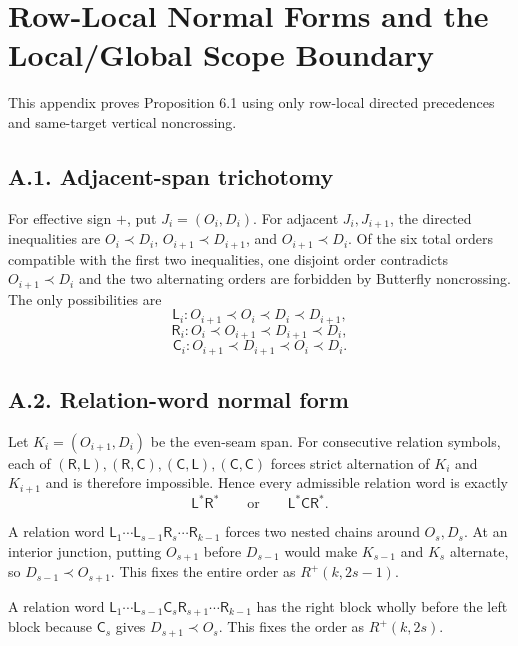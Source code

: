\documentclass[11pt]{article}
\theoremstyle{definition}
\theoremstyle{remark}
\begin{document}
\appendix
\section{Row-Local Normal Forms and the Local/Global Scope Boundary}\label{appendix-a.-row-local-normal-forms-and-the-localglobal-scope-boundary}

This appendix proves Proposition 6.1 using only row-local directed
precedences and same-target vertical noncrossing.

\subsection{A.1. Adjacent-span
trichotomy}\label{a.1.-adjacent-span-trichotomy}

For effective sign \(+\), put \(J_i=(O_i,D_i)\). For adjacent
\(J_i,J_{i+1}\), the directed inequalities are \(O_i\prec D_i\),
\(O_{i+1}\prec D_{i+1}\), and \(O_{i+1}\prec D_i\). Of the six total
orders compatible with the first two inequalities, one disjoint order
contradicts \(O_{i+1}\prec D_i\) and the two alternating orders are
forbidden by Butterfly noncrossing. The only possibilities are \[
\mathsf{L}_i: O_{i+1}\prec O_i\prec D_i\prec D_{i+1},
\] \[
\mathsf{R}_i: O_i\prec O_{i+1}\prec D_{i+1}\prec D_i,
\] \[
\mathsf{C}_i: O_{i+1}\prec D_{i+1}\prec O_i\prec D_i.
\]

\subsection{A.2. Relation-word normal
form}\label{a.2.-relation-word-normal-form}

Let \(K_i=(O_{i+1},D_i)\) be the even-seam span. For consecutive
relation symbols, each of
\((\mathsf R,\mathsf L),(\mathsf R,\mathsf C),(\mathsf C,\mathsf L),(\mathsf C,\mathsf C)\)
forces strict alternation of \(K_i\) and \(K_{i+1}\) and is therefore
impossible. Hence every admissible relation word is exactly \[
\mathsf L^*\mathsf R^*\qquad\text{or}\qquad \mathsf L^*\mathsf C\mathsf R^*.
\]

A relation word
\(\mathsf L_1\cdots \mathsf L_{s-1}\mathsf R_s\cdots \mathsf R_{k-1}\)
forces two nested chains around \(O_s,D_s\). At an interior junction,
putting \(O_{s+1}\) before \(D_{s-1}\) would make \(K_{s-1}\) and
\(K_s\) alternate, so \(D_{s-1}\prec O_{s+1}\). This fixes the entire
order as \(R^+(k,2s-1)\).

A relation word
\(\mathsf L_1\cdots \mathsf L_{s-1}\mathsf C_s\mathsf R_{s+1}\cdots \mathsf R_{k-1}\)
has the right block wholly before the left block because \(\mathsf C_s\)
gives \(D_{s+1}\prec O_s\). This fixes the order as \(R^+(k,2s)\).
\end{document}
